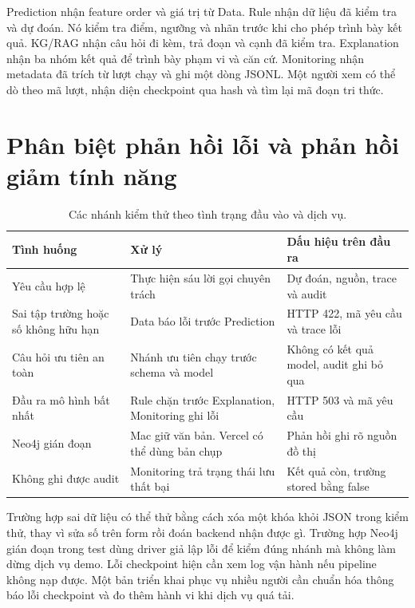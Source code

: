 

Prediction nhận feature order và giá trị từ Data. Rule nhận dữ liệu đã kiểm tra và dự đoán. Nó kiểm tra điểm, ngưỡng và nhãn trước khi cho phép trình bày kết quả. KG/RAG nhận câu hỏi đi kèm, trả đoạn và cạnh đã kiểm tra. Explanation nhận ba nhóm kết quả để trình bày phạm vi và căn cứ. Monitoring nhận metadata đã trích từ lượt chạy và ghi một dòng JSONL. Một người xem có thể dò theo mã lượt, nhận diện checkpoint qua hash và tìm lại mã đoạn tri thức.

\section{Phân biệt phản hồi lỗi và phản hồi giảm tính năng}
\begin{table}[H]\centering\small{}
\caption{Các nhánh kiểm thử theo tình trạng đầu vào và dịch vụ.}
\begin{tabular}{P{4.0cm}P{5.2cm}P{5cm}}\toprule
Tình huống & Xử lý & Dấu hiệu trên đầu ra\\\midrule
Yêu cầu hợp lệ & Thực hiện sáu lời gọi chuyên trách & Dự đoán, nguồn, trace và audit\\
Sai tập trường hoặc số không hữu hạn & Data báo lỗi trước Prediction & HTTP 422, mã yêu cầu và trace lỗi\\
Câu hỏi ưu tiên an toàn & Nhánh ưu tiên chạy trước schema và model & Không có kết quả model, audit ghi bỏ qua\\
Đầu ra mô hình bất nhất & Rule chặn trước Explanation, Monitoring ghi lỗi & HTTP 503 và mã yêu cầu\\
Neo4j gián đoạn & Mac giữ văn bản. Vercel có thể dùng bản chụp & Phản hồi ghi rõ nguồn đồ thị\\
Không ghi được audit & Monitoring trả trạng thái lưu thất bại & Kết quả còn, trường stored bằng false\\\bottomrule
\end{tabular}
\end{table}

Trường hợp sai dữ liệu có thể thử bằng cách xóa một khóa khỏi JSON trong kiểm thử, thay vì sửa số trên form rồi đoán backend nhận được gì. Trường hợp Neo4j gián đoạn trong test dùng driver giả lập lỗi để kiểm đúng nhánh mà không làm dừng dịch vụ demo. Lỗi checkpoint hiện cần xem log vận hành nếu pipeline không nạp được. Một bản triển khai phục vụ nhiều người cần chuẩn hóa thông báo lỗi checkpoint và đo thêm hành vi khi dịch vụ quá tải.


